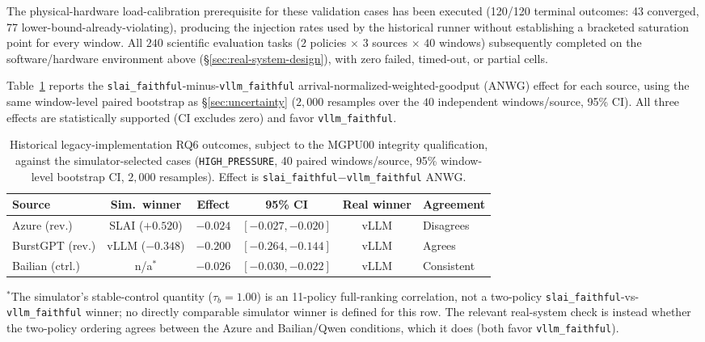 The physical-hardware load-calibration prerequisite for these validation cases has been executed (120/120 terminal outcomes: 43 converged, 77 lower-bound-already-violating), producing the injection rates used by the historical runner without establishing a bracketed saturation point for every window. All $240$ scientific evaluation tasks ($2$ policies $\times$ $3$ sources $\times$ $40$ windows) subsequently completed on the software/hardware environment above (\S\ref{sec:real-system-design}), with zero failed, timed-out, or partial cells.

Table~\ref{tab:rq6-results} reports the \texttt{slai\_faithful}-minus-\texttt{vllm\_faithful} arrival-normalized-weighted-goodput (ANWG) effect for each source, using the same window-level paired bootstrap as \S\ref{sec:uncertainty} ($2{,}000$ resamples over the $40$ independent windows/source, 95\% CI). All three effects are statistically supported (CI excludes zero) and favor \texttt{vllm\_faithful}.

\begin{table}[t]
\centering
\caption{Historical legacy-implementation RQ6 outcomes, subject to the MGPU00 integrity qualification, against the simulator-selected cases (\texttt{HIGH\_PRESSURE}, 40 paired windows/source, 95\% window-level bootstrap CI, $2{,}000$ resamples). Effect is \texttt{slai\_faithful}$-$\texttt{vllm\_faithful} ANWG.}
\label{tab:rq6-results}
\small
\setlength{\tabcolsep}{4.5pt}
\begin{tabular}{lccccl}
\toprule
Source & Sim.\ winner & Effect & 95\% CI & Real winner & Agreement \\
\midrule
Azure (rev.) & SLAI ($+0.520$) & $-0.024$ & $[-0.027,-0.020]$ & vLLM & Disagrees \\
BurstGPT (rev.) & vLLM ($-0.348$) & $-0.200$ & $[-0.264,-0.144]$ & vLLM & Agrees \\
Bailian (ctrl.) & n/a$^{*}$ & $-0.026$ & $[-0.030,-0.022]$ & vLLM & Consistent \\
\bottomrule
\end{tabular}
\vspace{2pt}

{\footnotesize $^{*}$The simulator's stable-control quantity ($\tau_b = 1.00$) is an
11-policy full-ranking correlation, not a two-policy \texttt{slai\_faithful}-vs-\texttt{vllm\_faithful}
winner; no directly comparable simulator winner is defined for this row. The
relevant real-system check is instead whether the two-policy ordering agrees
between the Azure and Bailian/Qwen conditions, which it does (both favor
\texttt{vllm\_faithful}).}
\end{table}

